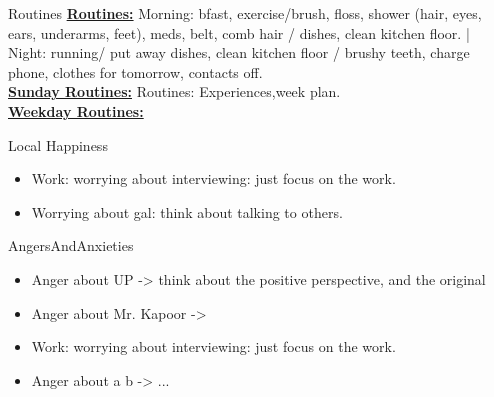 \documentclass[serif, mathserif, final]{beamer}
\begin{document}
\begin{frame}
  \begin{columns}
    \begin{column}{0.25\linewidth} %
      \begin{block}{Routines}
      { \tiny\underline{ \bf Routines:} Morning: bfast, exercise/brush,
        floss, shower (hair, eyes, ears, underarms, feet), meds, belt,
        comb hair / dishes, clean kitchen floor. |  Night: running/ put
        away dishes, clean kitchen floor / brushy teeth, charge phone,
        clothes for tomorrow, contacts off.} \\ 
      {\tiny \underline{\bf Sunday Routines:} Routines: Experiences,week plan.} \\ 
      {\tiny \underline{\bf Weekday Routines:}}  
      \end{block} 
      \begin{block}{Local Happiness}
        \begin{itemize} 
          \tiny \item \tiny Work: worrying about interviewing: just focus on the work. 
        \item \tiny Worrying about gal: think about talking to others. 
        \end{itemize}
      \end{block} 
      \begin{block}{AngersAndAnxieties}
        \begin{itemize}
          \tiny \item \tiny Anger about UP -> think about the positive
          perspective, and the original
        \item \tiny Anger about Mr. Kapoor ->  
        \item \tiny Work: worrying about interviewing: just
          focus on the work. 
        \item \tiny Anger about a b  -> ...


\end{itemize}
\end{block}
\end{column}
\end{columns}
\end{frame}
\end{document}
